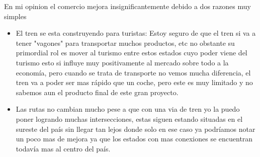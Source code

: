 \documentclass{article}
\begin{document}
En mi opinion el comercio mejora insignificantemente debido a dos razones muy simples
\begin{itemize}
  \item El tren se esta construyendo para turistas:
  Estoy seguro de que el tren si va a tener "vagones" para transportar muchos productos, etc 
  no obstante su primordial rol es mover al turismo entre estos estados cuyo poder viene del turismo
  esto si influye muy positivamente al mercado sobre todo a la economía, pero cuando se trata de 
  transporte no vemos mucha diferencia, el tren va a poder ser mas rápido que un coche, pero este 
  es muy limitado y no sabemos aun el producto final de este gran proyecto. 
  \item Las rutas no cambian mucho
  pese a que con una via de tren yo la puedo poner logrando muchas intersecciones, estas siguen 
  estando situadas en el sureste del país sin llegar tan lejos donde solo en ese caso ya podríamos
  notar un poco mas de mejora ya que los estados con mas conexiones se encuentran todavía mas al centro
  del país.
\end{itemize}




  
\end{document}
